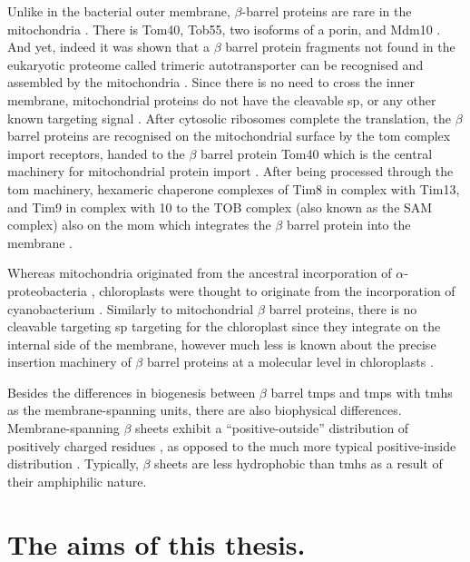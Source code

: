 Unlike in the bacterial outer membrane, $\beta$-barrel proteins are rare in the mitochondria \cite{Ulrich2015}.
There is Tom40, Tob55, two isoforms of a porin, and Mdm10 \cite{Ulrich2015}.
And yet, indeed it was shown that a $\beta$ barrel protein fragments not found in the eukaryotic proteome called trimeric autotransporter can be recognised and assembled by the mitochondria \cite{Muller2011}.
Since there is no need to cross the inner membrane, mitochondrial proteins do not have the cleavable \gls{sp}, or any other known targeting signal \cite{Ulrich2015}.
After cytosolic ribosomes complete the translation, the $\beta$ barrel proteins are recognised on the mitochondrial surface by the \gls{tom} complex import receptors, handed to the $\beta$ barrel protein Tom40 which is the central machinery for mitochondrial protein import \cite{Chacinska2009}.
After being processed through the \gls{tom} machinery, hexameric chaperone complexes of Tim8 in complex with Tim13, and Tim9 in complex with 10 to the TOB complex (also known as the SAM complex) also on the \gls{mom} which integrates the $\beta$ barrel protein into the membrane \cite{Wiedemann2003, Paschen2003, Gentle2004}.

Whereas mitochondria originated from the ancestral incorporation of $\alpha$\--proteobacteria \cite{Gray1999}, chloroplasts were thought to originate from the incorporation of cyanobacterium \cite{McFadden2001}.
Similarly to mitochondrial $\beta$ barrel proteins, there is no cleavable targeting \gls{sp} targeting for the chloroplast since they integrate on the internal side of the membrane, however much less is known about the precise insertion machinery of $\beta$ barrel proteins at a molecular level in chloroplasts \cite{Ulrich2015}.

Besides the differences in biogenesis between $\beta$ barrel \gls{tmp}s and \gls{tmp}s with \gls{tmh}s as the membrane\--spanning units, there are also biophysical differences.
Membrane\--spanning $\beta$ sheets exhibit a ``positive\--outside'' distribution of positively charged residues \cite{Pogozheva2013}, as opposed to the much more typical positive\--inside distribution \cite{VonHeijne1989, Andersson1992, Pogozheva2013, Sharpe2010, Baeza-Delgado2013}.
Typically, $\beta$ sheets are less hydrophobic than \gls{tmh}s \cite{Tamm2004} as a result of their amphiphilic nature.

\section{The aims of this thesis.}

